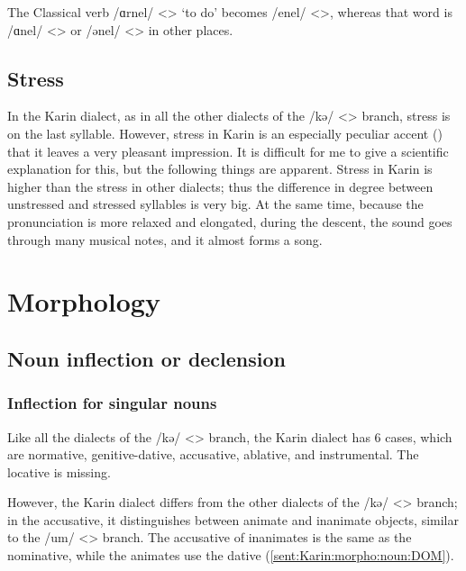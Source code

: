The Classical verb /ɑrnel/ <> `to do' becomes /enel/ <>, whereas that word is /ɑnel/ <> or /ənel/ <> in other places. 

 

\subsection{Stress}

In the Karin dialect, as in all the other dialects of the /kə/ <> branch, stress is on the last syllable. However, stress in Karin is an especially peculiar accent () that it leaves a very pleasant impression. It is difficult for me to give a scientific explanation for this, but the following things are apparent. Stress in Karin is higher than the stress in other dialects; thus the difference in degree between unstressed and stressed syllables is very big. At the same time, because the pronunciation is more relaxed and elongated, during the descent, the sound goes through many musical notes, and it almost forms a song. 

\section{Morphology}
\subsection{Noun inflection or declension}

\subsubsection{Inflection for singular nouns}

Like all the dialects of the /kə/ <> branch, the Karin dialect has 6 cases, which are normative, genitive-dative, accusative, ablative, and instrumental. The locative is missing. 

However, the Karin dialect differs from the other dialects of the /kə/ <> branch; in the accusative, it distinguishes between animate and inanimate objects, similar to the /um/ <> branch. The accusative of inanimates is the same as the nominative, while the animates use the dative (\ref{sent:Karin:morpho:noun:DOM}). 


